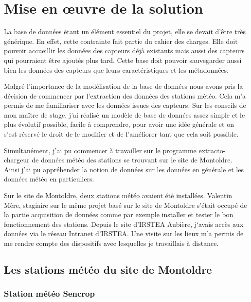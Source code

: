 \section{Mise en œuvre de la solution} 

La base de données étant un élément essentiel du projet, elle se devait d’être très générique. En effet, cette contrainte fait partie du cahier des charges. Elle doit pouvoir accueillir les données des capteurs déjà existants mais aussi des capteurs qui pourraient être ajoutés plus tard. Cette base doit pouvoir sauvegarder aussi bien les données des capteurs que leurs caractéristiques et les métadonnées.

Malgré l'importance de la modélisation de la base de données nous avons pris la décision de commencer par l'extraction des données des stations météo. Cela m'a permis de me familiariser avec les données issues des capteurs. Sur les conseils de mon maître de stage, j'ai réalisé un modèle de base de données assez simple et le plus évolutif possible, facile à comprendre, pour avoir une idée générale et on s’est réservé le droit de le modifier et de l’améliorer tant que cela soit possible. 

Simultanément, j’ai pu commencer à travailler sur le programme extracto-chargeur de données météo des stations se trouvant sur le site de Montoldre. Ainsi j’ai pu appréhender la notion de données sur les données en générale et les données météo en particuliers.  

 
Sur le site de Montoldre, deux stations météo avaient été installées. Valentin Mère, stagiaire sur le même projet basé sur le site de Montoldre s’était occupé de la partie acquisition de données comme par exemple installer et tester le bon fonctionnement des stations. Depuis le site d’IRSTEA Aubière, j‘avais accès aux données via le réseau Intranet d’IRSTEA. Une visite sur les lieux m’a permis de me rendre compte des dispositifs avec lesquelles je travaillais à distance.  

\subsection{Les stations météo du site de Montoldre} 

\subsubsection{Station météo Sencrop}

